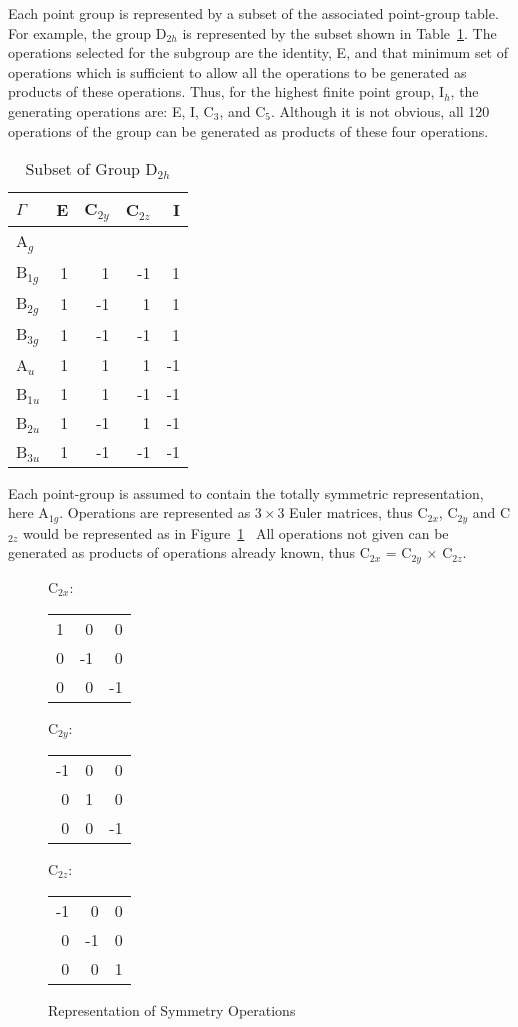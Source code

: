 Each point group is represented by a subset of the associated point-group
table. For example, the group D$_{2h}$ is represented by the subset shown in
Table~\ref{d2h}. The operations selected for the subgroup are the identity, E,
and that minimum set of operations which is sufficient to allow all the
operations to be generated as products of these operations.  Thus, for the
highest finite point group, I$_h$, the generating operations are: E, I, C$_3$,
and C$_5$.  Although it is not obvious, all 120 operations of the group can be
generated as products of these four operations.

\begin{table} 
\caption{\label{d2h}Subset of Group D$_{2h}$}
\begin{center}
\begin{tabular}{lrrrr} \\ \hline
  $\Gamma$ &  E  &  C$_{2y}$ & C$_{2z}$& I \\ \hline
A$_g$   \\
B$_{1g}$ &1 &  1  &-1  &  1  \\
B$_{2g}$ &1 & -1  & 1  &  1  \\
B$_{3g}$ &1 & -1  &-1  &  1  \\
A$_{u} $ &1 &  1  & 1  & -1  \\
B$_{1u}$ &1 &  1  &-1  & -1  \\
B$_{2u}$ &1 & -1  & 1  & -1  \\
B$_{3u}$ &1 & -1  &-1  & -1  \\ \hline
\end{tabular}\end{center}
\end{table}

Each point-group is assumed to contain the totally symmetric representation,
here  A$_{1g}$.  Operations are represented as $3\times3$
Euler matrices, thus C$_{2x}$, C$_{2y}$  and C$_{2z}$  would be represented as
in Figure~\ref{c2op} \ All operations not given can be generated as products of
operations already known, thus C$_{2x}$ = C$_{2y}$ $\times$ C$_{2z}$.

\begin{figure}
\begin{makeimage}
\end{makeimage}
\begin{center}\hfil
C$_{2x}$: \begin{tabular}{|rrr|}1&0&0\\0&-1&0\\0&0&-1\end{tabular}\hfil
C$_{2y}$: \begin{tabular}{|rrr|}-1&0&0\\0&1&0\\0&0&-1\end{tabular}\hfil
C$_{2z}$: \begin{tabular}{|rrr|}-1&0&0\\0&-1&0\\0&0&1\end{tabular}\hfil
\end{center}
\caption{\label{c2op} Representation of Symmetry Operations}
\end{figure}

